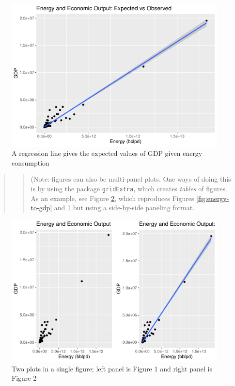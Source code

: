 \documentclass[]{elsarticle} %
\makeatletter
\def\maxwidth{\ifdim\Gin@nat@width>\linewidth\linewidth
\else\Gin@nat@width\fi}
\let\Oldincludegraphics\includegraphics
\renewcommand{\includegraphics}[1]{\Oldincludegraphics[width=\maxwidth]{#1}}
\makeatother
\begin{document}
\begin{figure}
\centering
\includegraphics{Elsevier-Template_files/figure-latex/fig-energy-to-gdp-with-line-1.pdf}
\caption{\label{fig:energy-to-gdp-with-line} A regression line gives the
expected values of GDP given energy consumption}
\end{figure}

\begin{quote}
\begin{quote}
(Note: figures can also be multi-panel plots. One ways of doing this is
by using the package \texttt{gridExtra}, which creates \emph{tables} of
figures. As an example, see Figure \ref{fig:right-left-panel-plot},
which reproduces Figures \ref{fig:energy-to-gdp} and
\ref{fig:energy-to-gdp-with-line} but using a side-by-side paneling
format.
\end{quote}
\end{quote}

\begin{figure}
\centering
\includegraphics{Elsevier-Template_files/figure-latex/fig-right-left-panel-plot-1.pdf}
\caption{\label{fig:right-left-panel-plot} Two plots in a single figure;
left panel is Figure 1 and right panel is Figure 2}
\end{figure}
\end{document}
